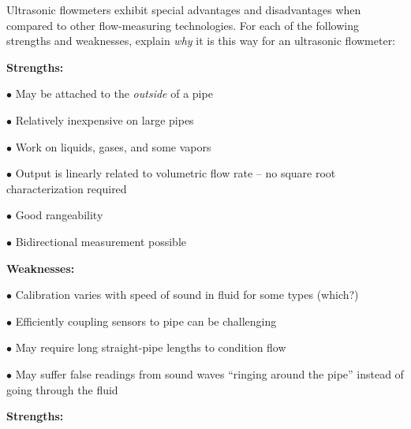 

Ultrasonic flowmeters exhibit special advantages and disadvantages when compared to other flow-measuring technologies.  For each of the following strengths and weaknesses, explain {\it why} it is this way for an ultrasonic flowmeter:

\vskip 10pt

{\bf Strengths:}

\medskip
\item{$\bullet$} May be attached to the {\it outside} of a pipe
\item{$\bullet$} Relatively inexpensive on large pipes
\item{$\bullet$} Work on liquids, gases, and some vapors
\item{$\bullet$} Output is linearly related to volumetric flow rate -- no square root characterization required
\item{$\bullet$} Good rangeability
\item{$\bullet$} Bidirectional measurement possible
\medskip

\vskip 10pt

{\bf Weaknesses:}

\medskip
\item{$\bullet$} Calibration varies with speed of sound in fluid for some types (which?)
\item{$\bullet$} Efficiently coupling sensors to pipe can be challenging
\item{$\bullet$} May require long straight-pipe lengths to condition flow
\item{$\bullet$} May suffer false readings from sound waves ``ringing around the pipe'' instead of going through the fluid
\medskip














{\bf Strengths:}

